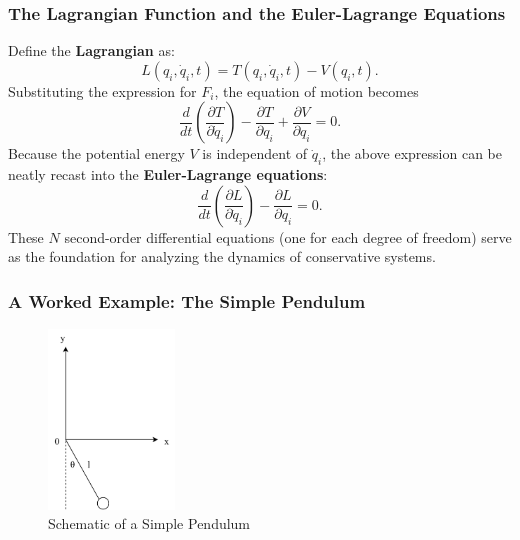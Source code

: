 \subsubsection{The Lagrangian Function and the Euler-Lagrange Equations}

Define the \textbf{Lagrangian} as:
\begin{equation}
    L(q_i, \dot{q}_i, t) = T(q_i, \dot{q}_i, t) - V(q_i, t).
\end{equation}
Substituting the expression for $F_i$, the equation of motion becomes
\begin{equation}
    \frac{d}{dt}\left(\frac{\partial T}{\partial \dot{q}_i}\right) - \frac{\partial T}{\partial q_i} + \frac{\partial V}{\partial q_i} = 0.
\end{equation}
Because the potential energy $V$ is independent of $\dot{q}_i$, the above expression can be neatly recast into the \textbf{Euler-Lagrange equations}:
\begin{equation}
    \frac{d}{dt}\left(\frac{\partial L}{\partial \dot{q}_i}\right) - \frac{\partial L}{\partial q_i} = 0.
\end{equation}
These $N$ second-order differential equations (one for each degree of freedom) serve as the foundation for analyzing the dynamics of conservative systems.

\subsubsection{A Worked Example: The Simple Pendulum}

\begin{figure}[ht]
    \centering
    \includegraphics[width=0.3\textwidth]{images/2-1-1.png}
    \caption{Schematic of a Simple Pendulum}
    \label{fig:2-1-1}
\end{figure}

